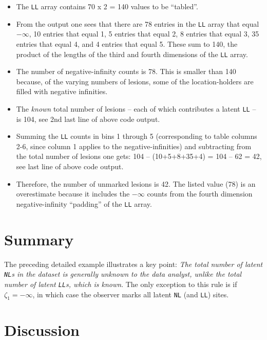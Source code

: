 \documentclass[
]{book}
\providecommand{\tightlist}{%
  \setlength{\itemsep}{0pt}\setlength{\parskip}{0pt}}
\begin{document}
\begin{itemize}
\tightlist
\item
  The \texttt{LL} array contains 70 x 2 = 140 values to be ``tabled''.
\item
  From the output one sees that there are 78 entries in the \texttt{LL} array that equal \(-\infty\), 10 entries that equal 1, 5 entries that equal 2, 8 entries that equal 3, 35 entries that equal 4, and 4 entries that equal 5. These sum to 140, the product of the lengths of the third and fourth dimensions of the \texttt{LL} array.
\item
  The number of negative-infinity counts is 78. This is smaller than 140 because, of the varying numbers of lesions, some of the location-holders are filled with negative infinities.\\
\item
  The \emph{known} total number of lesions -- each of which contributes a latent \texttt{LL} -- is 104, see 2nd last line of above code output.\\
\item
  Summing the \texttt{LL} counts in bins 1 through 5 (corresponding to table columns 2-6, since column 1 applies to the negative-infinities) and subtracting from the total number of lesions one gets: 104 -- (10+5+8+35+4) = 104 -- 62 = 42, see last line of above code output.
\item
  Therefore, the number of unmarked lesions is 42. The listed value (78) is an overestimate because it includes the \(-\infty\) counts from the fourth dimension negative-infinity ``padding'' of the \texttt{LL} array.
\end{itemize}

\hypertarget{froc-empirical-examples-summary}{%
\section{Summary}\label{froc-empirical-examples-summary}}

The preceding detailed example illustrates a key point: \emph{The total number of latent \texttt{NL}s in the dataset is generally unknown to the data analyst, unlike the total number of latent \texttt{LL}s, which is known}. The only exception to this rule is if \(\zeta_1 = -\infty\), in which case the observer marks all latent \texttt{NL} (and \texttt{LL}) sites.

\hypertarget{froc-empirical-examples-Discussion}{%
\section{Discussion}\label{froc-empirical-examples-Discussion}}
\end{document}
